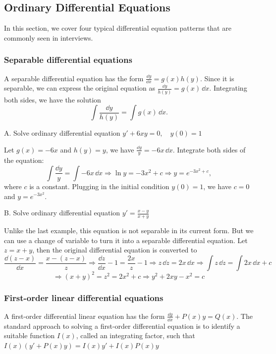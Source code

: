 \subsection{Ordinary Differential Equations}

In this section, we cover four typical differential equation patterns that are commonly seen in interviews.

\subsubsection*{Separable differential equations}

A separable differential equation has the form \(\frac{\dd y}{\dd x}=g(x)h(y).\) Since it is separable, we can express the original equation as \(\frac{\dd y}{h(y)}=g(x)\,\dd x.\) Integrating both sides, we have the solution
\[
\int\frac{\dd y}{h(y)}=\int g(x)\,\dd x.
\]

\begin{problem}{A. Solve ordinary differential equation \(y'+6xy=0,\quad y(0)=1\)}
\end{problem}

\begin{solution}
Let \(g(x)=-6x\) and \(h(y)=y\), we have \(\frac{\dd y}{y}=-6x\,\dd x.\) Integrate both sides of the equation:
\[
\int\frac{\dd y}{y}=\int-6x\,\dd x\Rightarrow\ln y=-3x^2+c\Rightarrow y=e^{-3x^2+c},
\]
where \(c\) is a constant. Plugging in the initial condition \(y(0)=1\), we have \(c=0\) and \(y=e^{-3x^2}.\)
\end{solution}

\begin{problem}{B. Solve ordinary differential equation \(y'=\frac{x-y}{x+y}\)}
\end{problem}

\begin{solution}
Unlike the last example, this equation is not separable in its current form. But we can use a change of variable to turn it into a separable differential equation. Let \(z=x+y\), then the original differential equation is converted to
\[
\frac{\dd(z-x)}{\dd x}=\frac{x-(z-x)}{z}\Rightarrow\frac{\dd z}{\dd x}-1=\frac{2x}{z}-1\Rightarrow z\,\dd z=2x\,\dd x\Rightarrow\int z\,\dd z=\int 2x\,\dd x+c
\]
\[
\Rightarrow (x+y)^2=z^2=2x^2+c\Rightarrow y^2+2xy-x^2=c
\]
\end{solution}

\subsubsection*{First-order linear differential equations}

A first-order differential linear equation has the form \(\frac{\dd y}{\dd x}+P(x)y=Q(x).\) The standard approach to solving a first-order differential equation is to identify a suitable function \(I(x)\), called an integrating factor, such that \(I(x)(y'+P(x)y)=I(x)y'+I(x)P(x)y\)
